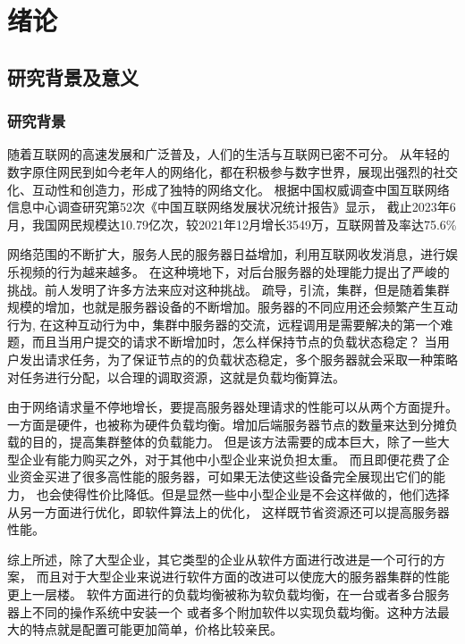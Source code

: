 \chapter{绪论}

\section{研究背景及意义}

\subsection{研究背景}

随着互联网的高速发展和广泛普及，人们的生活与互联网已密不可分。
从年轻的数字原住网民到如今老年人的网络化，都在积极参与数字世界，展现出强烈的社交化、互动性和创造力，形成了独特的网络文化。
根据中国权威调查中国互联网络信息中心调查研究第52次《中国互联网络发展状况统计报告》显示，
截止2023年6月，我国网民规模达10.79亿次，较2021年12月增长3549万，互联网普及率达75.6\%\cite{vsgohulmwhlofavjvlkltsjibcgc}

网络范围的不断扩大，服务人民的服务器日益增加，利用互联网收发消息，进行娱乐视频的行为越来越多。
在这种境地下，对后台服务器的处理能力提出了严峻的挑战。前人发明了许多方法来应对这种挑战。
疏导，引流，集群，但是随着集群规模的增加，也就是服务器设备的不断增加。服务器的不同应用还会频繁产生互动行为,
在这种互动行为中，集群中服务器的交流，远程调用是需要解决的第一个难题，而且当用户提交的请求不断增加时，怎么样保持节点的负载状态稳定？
当用户发出请求任务，为了保证节点的的负载状态稳定，多个服务器就会采取一种策略对任务进行分配，以合理的调取资源，这就是负载均衡算法。

由于网络请求量不停地增长，要提高服务器处理请求的性能可以从两个方面提升。
一方面是硬件，也被称为硬件负载均衡。增加后端服务器节点的数量来达到分摊负载的目的，提高集群整体的负载能力。
但是该方法需要的成本巨大，除了一些大型企业有能力购买之外，对于其他中小型企业来说负担太重。
而且即便花费了企业资金买进了很多高性能的服务器，可如果无法使这些设备完全展现出它们的能力，
也会使得性价比降低。但是显然一些中小型企业是不会这样做的，他们选择从另一方面进行优化，即软件算法上的优化，
这样既节省资源还可以提高服务器性能。\cite{qbee}

综上所述，除了大型企业，其它类型的企业从软件方面进行改进是一个可行的方案，
而且对于大型企业来说进行软件方面的改进可以使庞大的服务器集群的性能更上一层楼。
软件方面进行的负载均衡被称为软负载均衡，在一台或者多台服务器上不同的操作系统中安装一个
或者多个附加软件以实现负载均衡。这种方法最大的特点就是配置可能更加简单，价格比较亲民。

